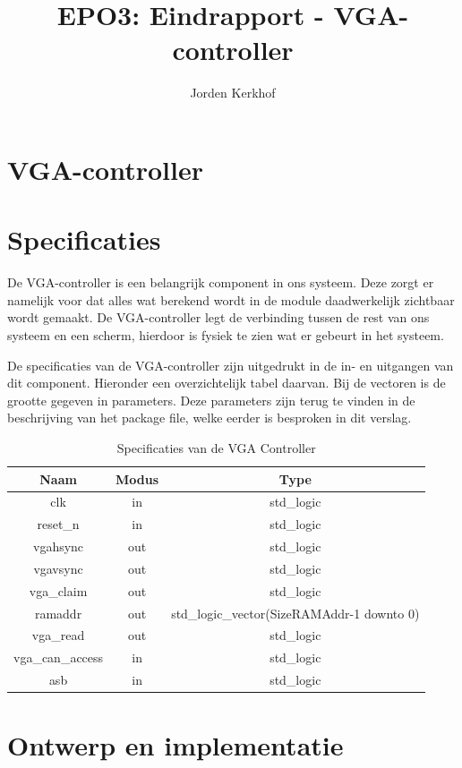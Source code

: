 \documentclass{scrartcl}  %
\author{ Jorden {Kerkhof}  }
\title{EPO3: Eindrapport - VGA-controller}
\begin{document}
\section{VGA-controller}
\label{ch:vga}
\section{Specificaties}

De VGA-controller is een belangrijk component in ons systeem. Deze zorgt er namelijk voor dat alles wat berekend wordt in de module daadwerkelijk zichtbaar wordt gemaakt. De VGA-controller legt de verbinding tussen de rest van ons systeem en een scherm, hierdoor is fysiek te zien wat er gebeurt in het systeem. 

De specificaties van de VGA-controller zijn uitgedrukt in de in- en uitgangen van dit component. Hieronder een overzichtelijk tabel daarvan. Bij de vectoren is de grootte gegeven in parameters. Deze parameters zijn terug te vinden in de beschrijving van het package file, welke eerder is besproken in dit verslag.

\begin{table}[H]
	\centering
	\caption{Specificaties van de VGA Controller }
	\label{tab:spec-vgacontroller}
	\begin{tabular}{c c c}
		\hline\hline
	 	Naam & Modus & Type\\
	 	\hline	
		clk & in & std\_logic \\ 
		reset\_n & in & std\_logic \\ 
		vgahsync & out & std\_logic \\ 
		vgavsync & out & std\_logic \\ 
		vga\_claim & out & std\_logic \\ 
		ramaddr & out & std\_logic\_vector(SizeRAMAddr-1 downto 0) \\
		vga\_read & out & std\_logic \\
		vga\_can\_access & in & std\_logic \\
		asb & in & std\_logic \\
	  	\hline\hline
	\end{tabular}
\end{table}

\section{Ontwerp en implementatie}
\end{document}
